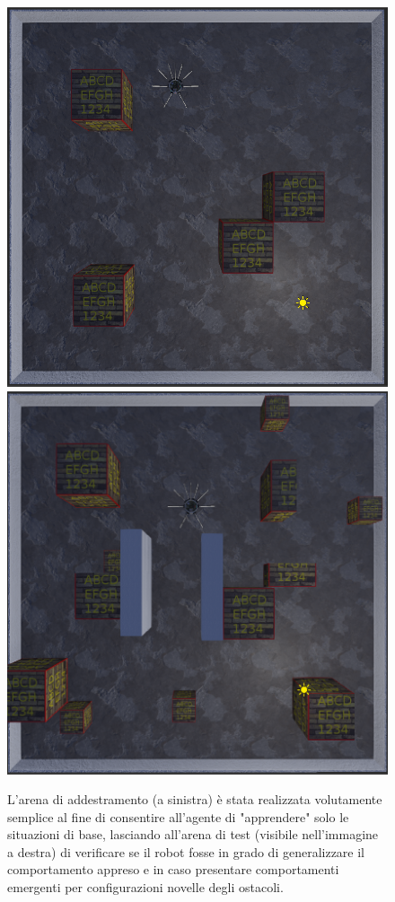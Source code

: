 \begin{figure}[H]
    \centering
    \includegraphics[scale=0.32,valign=t]{figures/train_arena.png}
    \includegraphics[scale=0.309,valign=t]{figures/test_arena.png}
    \caption{L'arena di addestramento (a sinistra) è stata realizzata volutamente semplice al fine di consentire all'agente di "apprendere" solo le situazioni di base, lasciando all'arena di test (visibile nell'immagine a destra) di verificare se il robot fosse in grado di generalizzare il comportamento appreso e in caso presentare comportamenti emergenti per configurazioni novelle degli ostacoli.}
    \label{fig:TrainArena}
\end{figure}

